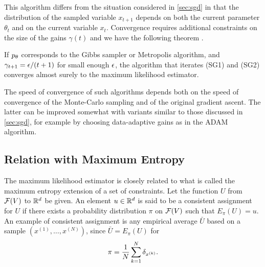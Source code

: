 This algorithm differs from the situation considered in \cref{sec:sgd} in that the distribution of the sampled variable $x_{t+1}$ depends on both the current parameter $\theta_t$ and on the current variable $x_t$. Convergence requires additional constraints on the size of the gains $\gamma(t)$ and we have the following theorem \citep{you88}.
\begin{theorem}
\label{th:stoc.grad}
If $p_\theta$ corresponds to the Gibbs sampler or Metropolis
algorithm, and $\gamma_{t+1} = \epsilon/(t+1)$ for small enough $\epsilon$, the
algorithm that iterates (SG1) and (SG2) converges almost surely to the maximum
likelihood estimator.
\end{theorem}

The speed of convergence of such algorithms depends both on the speed
of convergence of the Monte-Carlo sampling and of the original
gradient ascent. The latter can be improved somewhat with variants similar to those discussed in \cref{sec:sgd}, for example by choosing data-adaptive gains as in the ADAM algorithm. 

\subsection{Relation with Maximum Entropy}

The maximum likelihood estimator is closely related to what is called
the maximum entropy extension of a set of constraints. Let the
function $U$ from ${\mathcal F}(V)$ to ${\mathbb{R}}^d$ be given. An element $u\in{\mathbb{R}}^d$ is
said to be a consistent assignment for $U$ if there exists a
probability distribution $\pi$ on ${\mathcal F}(V)$ such that $E_\pi(U) = u$. An
example of consistent assignment is any empirical average $\bar U$
based on a sample $(x^{(1)}, \ldots, x^{(N)})$, since $\bar U =
E_\pi(U)$ for
\[
\pi = \frac1N\sum_{k=1}^N \delta_{x^{(k)}}.
\]


